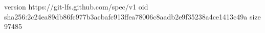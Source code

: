 version https://git-lfs.github.com/spec/v1
oid sha256:2c24ea89db86fc977b3acbafc913ffea78006c8aadb2e9f35238a4ce1413c49a
size 97485
